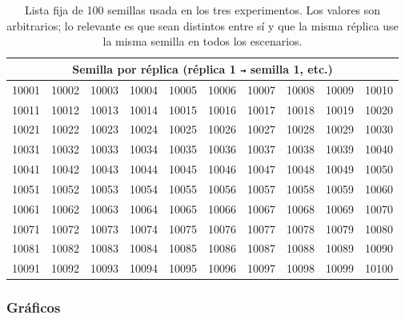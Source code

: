 \documentclass[a4paper, 11pt]{article}
\begin{document}
\begin{table}[H]
\centering
\small
\begin{tabular}{cccccccccc}
\toprule
\multicolumn{10}{c}{\textbf{Semilla por r\'eplica} (r\'eplica 1 \texttt{→} semilla 1, etc.)} \\
\midrule
10001 & 10002 & 10003 & 10004 & 10005 & 10006 & 10007 & 10008 & 10009 & 10010 \\
10011 & 10012 & 10013 & 10014 & 10015 & 10016 & 10017 & 10018 & 10019 & 10020 \\
10021 & 10022 & 10023 & 10024 & 10025 & 10026 & 10027 & 10028 & 10029 & 10030 \\
10031 & 10032 & 10033 & 10034 & 10035 & 10036 & 10037 & 10038 & 10039 & 10040 \\
10041 & 10042 & 10043 & 10044 & 10045 & 10046 & 10047 & 10048 & 10049 & 10050 \\
10051 & 10052 & 10053 & 10054 & 10055 & 10056 & 10057 & 10058 & 10059 & 10060 \\
10061 & 10062 & 10063 & 10064 & 10065 & 10066 & 10067 & 10068 & 10069 & 10070 \\
10071 & 10072 & 10073 & 10074 & 10075 & 10076 & 10077 & 10078 & 10079 & 10080 \\
10081 & 10082 & 10083 & 10084 & 10085 & 10086 & 10087 & 10088 & 10089 & 10090 \\
10091 & 10092 & 10093 & 10094 & 10095 & 10096 & 10097 & 10098 & 10099 & 10100 \\
\bottomrule
\end{tabular}
\caption{Lista fija de 100 semillas usada en los tres experimentos. Los valores son
arbitrarios; lo relevante es que sean distintos entre s\'i y que la misma r\'eplica
use la misma semilla en todos los escenarios.}
\label{tab:semillas}
\end{table}

\subsubsection{Gr\'aficos}\label{sub:graficos}
\end{document}
